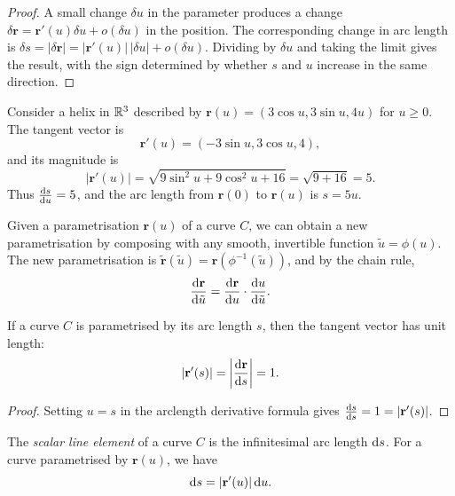\documentclass[a4paper]{article}
\begin{document}
\begin{proof}
  A small change $\delta u$ in the parameter produces a change $\delta \mathbf{r} = \mathbf{r}'(u)\delta u + o(\delta u)$ in the position. The corresponding change in arc length is $\delta s = |\delta \mathbf{r}| = |\mathbf{r}'(u)|\,|\delta u| + o(\delta u)$. Dividing by $\delta u$ and taking the limit gives the result, with the sign determined by whether $s$ and $u$ increase in the same direction.
\end{proof}

\begin{eg}
  Consider a helix in $\mathbb{R}^3$ described by $\mathbf{r}(u) = (3\cos u, 3\sin u, 4u)$ for $u \geq 0$. The tangent vector is
  \[
    \mathbf{r}'(u) = (-3\sin u, 3\cos u, 4),
  \]
  and its magnitude is
  \[
    |\mathbf{r}'(u)| = \sqrt{9\sin^2 u + 9\cos^2 u + 16} = \sqrt{9 + 16} = 5.
  \]
  Thus $\frac{\mathrm{d} s}{\mathrm{d} u} = 5$, and the arc length from $\mathbf{r}(0)$ to $\mathbf{r}(u)$ is $s = 5u$.
\end{eg}

\begin{rmk}[Reparametrisation]
  Given a parametrisation $\mathbf{r}(u)$ of a curve $C$, we can obtain a new parametrisation by composing with any smooth, invertible function $\tilde{u} = \phi(u)$. The new parametrisation is $\tilde{\mathbf{r}}(\tilde{u}) = \mathbf{r}(\phi^{-1}(\tilde{u}))$, and by the chain rule,
  \[
    \frac{\mathrm{d} \mathbf{r}}{\mathrm{d} \tilde{u}} = \frac{\mathrm{d} \mathbf{r}}{\mathrm{d} u} \cdot \frac{\mathrm{d} u}{\mathrm{d} \tilde{u}}.
  \]
\end{rmk}

\begin{cor}
  If a curve $C$ is parametrised by its arc length $s$, then the tangent vector has unit length:
  \[
    |\mathbf{r}'(s)| = \left|\frac{\mathrm{d} \mathbf{r}}{\mathrm{d} s}\right| = 1.
  \]
\end{cor}

\begin{proof}
  Setting $u = s$ in the arclength derivative formula gives $\frac{\mathrm{d} s}{\mathrm{d} s} = 1 = |\mathbf{r}'(s)|$.
\end{proof}

\begin{defi}
  The \emph{scalar line element} of a curve $C$ is the infinitesimal arc length $\mathrm{d} s$. For a curve parametrised by $\mathbf{r}(u)$, we have
  \[
    \mathrm{d} s = |\mathbf{r}'(u)| \, \mathrm{d} u.
  \]
\end{defi}
\end{document}
